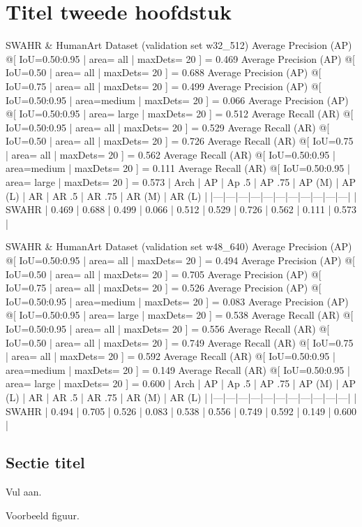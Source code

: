 \chapter{Titel tweede hoofdstuk}
\label{chap:evaluation}

SWAHR & HumanArt Dataset (validation set w32_512)
Average Precision  (AP) @[ IoU=0.50:0.95 | area=   all | maxDets= 20 ] = 0.469
 Average Precision  (AP) @[ IoU=0.50      | area=   all | maxDets= 20 ] = 0.688
 Average Precision  (AP) @[ IoU=0.75      | area=   all | maxDets= 20 ] = 0.499
 Average Precision  (AP) @[ IoU=0.50:0.95 | area=medium | maxDets= 20 ] = 0.066
 Average Precision  (AP) @[ IoU=0.50:0.95 | area= large | maxDets= 20 ] = 0.512
 Average Recall     (AR) @[ IoU=0.50:0.95 | area=   all | maxDets= 20 ] = 0.529
 Average Recall     (AR) @[ IoU=0.50      | area=   all | maxDets= 20 ] = 0.726
 Average Recall     (AR) @[ IoU=0.75      | area=   all | maxDets= 20 ] = 0.562
 Average Recall     (AR) @[ IoU=0.50:0.95 | area=medium | maxDets= 20 ] = 0.111
 Average Recall     (AR) @[ IoU=0.50:0.95 | area= large | maxDets= 20 ] = 0.573
| Arch | AP | Ap .5 | AP .75 | AP (M) | AP (L) | AR | AR .5 | AR .75 | AR (M) | AR (L) |
|---|---|---|---|---|---|---|---|---|---|---|
| SWAHR | 0.469 | 0.688 | 0.499 | 0.066 | 0.512 | 0.529 | 0.726 | 0.562 | 0.111 | 0.573 |

SWAHR & HumanArt Dataset (validation set w48_640)
Average Precision  (AP) @[ IoU=0.50:0.95 | area=   all | maxDets= 20 ] = 0.494
Average Precision  (AP) @[ IoU=0.50      | area=   all | maxDets= 20 ] = 0.705
Average Precision  (AP) @[ IoU=0.75      | area=   all | maxDets= 20 ] = 0.526
Average Precision  (AP) @[ IoU=0.50:0.95 | area=medium | maxDets= 20 ] = 0.083
Average Precision  (AP) @[ IoU=0.50:0.95 | area= large | maxDets= 20 ] = 0.538
Average Recall     (AR) @[ IoU=0.50:0.95 | area=   all | maxDets= 20 ] = 0.556
Average Recall     (AR) @[ IoU=0.50      | area=   all | maxDets= 20 ] = 0.749
Average Recall     (AR) @[ IoU=0.75      | area=   all | maxDets= 20 ] = 0.592
Average Recall     (AR) @[ IoU=0.50:0.95 | area=medium | maxDets= 20 ] = 0.149
Average Recall     (AR) @[ IoU=0.50:0.95 | area= large | maxDets= 20 ] = 0.600
| Arch | AP | Ap .5 | AP .75 | AP (M) | AP (L) | AR | AR .5 | AR .75 | AR (M) | AR (L) |
|---|---|---|---|---|---|---|---|---|---|---|
| SWAHR | 0.494 | 0.705 | 0.526 | 0.083 | 0.538 | 0.556 | 0.749 | 0.592 | 0.149 | 0.600 |

\lipsum[9-10]

\section{Sectie titel}
\label{sec:scalable_faafo}

Vul aan.

\lipsum[10-12]
Voorbeeld figuur.